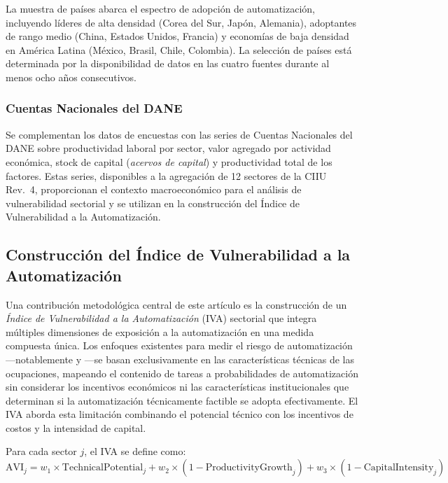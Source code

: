 \documentclass{article}
\begin{document}
La muestra de pa\'ises abarca el espectro de adopci\'on de automatizaci\'on, incluyendo l\'ideres de alta densidad (Corea del Sur, Jap\'on, Alemania), adoptantes de rango medio (China, Estados Unidos, Francia) y econom\'ias de baja densidad en Am\'erica Latina (M\'exico, Brasil, Chile, Colombia). La selecci\'on de pa\'ises est\'a determinada por la disponibilidad de datos en las cuatro fuentes durante al menos ocho a\~nos consecutivos.

\subsubsection*{Cuentas Nacionales del DANE}

Se complementan los datos de encuestas con las series de Cuentas Nacionales del DANE sobre productividad laboral por sector, valor agregado por actividad econ\'omica, stock de capital (\textit{acervos de capital}) y productividad total de los factores. Estas series, disponibles a la agregaci\'on de 12 sectores de la CIIU Rev.\ 4, proporcionan el contexto macroecon\'omico para el an\'alisis de vulnerabilidad sectorial y se utilizan en la construcci\'on del \'Indice de Vulnerabilidad a la Automatizaci\'on.


\subsection{Construcci\'on del \'Indice de Vulnerabilidad a la Automatizaci\'on}
\label{subsec:avi_construction}

Una contribuci\'on metodol\'ogica central de este art\'iculo es la construcci\'on de un \textit{\'Indice de Vulnerabilidad a la Automatizaci\'on} (IVA) sectorial que integra m\'ultiples dimensiones de exposici\'on a la automatizaci\'on en una medida compuesta \'unica. Los enfoques existentes para medir el riesgo de automatizaci\'on---notablemente \cite{frey2017future} y \cite{morales2023risk}---se basan exclusivamente en las caracter\'isticas t\'ecnicas de las ocupaciones, mapeando el contenido de tareas a probabilidades de automatizaci\'on sin considerar los incentivos econ\'omicos ni las caracter\'isticas institucionales que determinan si la automatizaci\'on t\'ecnicamente factible se adopta efectivamente. El IVA aborda esta limitaci\'on combinando el potencial t\'ecnico con los incentivos de costos y la intensidad de capital.

Para cada sector $j$, el IVA se define como:
\begin{equation}
\text{AVI}_j = w_1 \times \text{TechnicalPotential}_j + w_2 \times (1 - \text{ProductivityGrowth}_j) + w_3 \times (1 - \text{CapitalIntensity}_j)
\label{eq:avi}
\end{equation}
\end{document}

